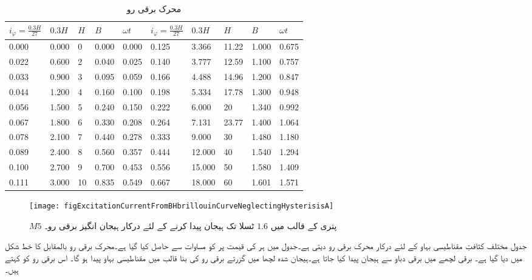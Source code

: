 %
\begin{table}
\begin{otherlanguage}{english}
\begin{tabular}{l l l l l | l l l l l}
$i_{\varphi}=\frac{0.3 H}{27}$&$0.3H$&$H$&$B$&$\omega t$&$i_{\varphi}=\frac{0.3 H}{27}$&$0.3H$&$H$&$B$&$\omega t$\\
\midrule
0.000&0.000&0&0.000&0.000&0.125&3.366&11.22&1.000&0.675\\
0.022&0.600&2&0.040&0.025&0.140&3.777&12.59&1.100&0.757\\
0.033&0.900&3&0.095&0.059&0.166&4.488&14.96&1.200&0.847\\
0.044&1.200&4&0.160&0.100&0.198&5.334&17.78&1.300&0.948\\
0.056&1.500&5&0.240&0.150&0.222&6.000&20&1.340&0.992\\
0.067&1.800&6&0.330&0.208&0.264&7.131&23.77&1.400&1.064\\
0.078&2.100&7&0.440&0.278&0.333&9.000&30&1.480&1.180\\
0.089&2.400&8&0.560&0.357&0.444&12.000&40&1.540&1.294\\
0.100&2.700&9&0.700&0.453&0.556&15.000&50&1.580&1.409\\
0.111&3.000&10&0.835&0.549&0.667&18.000&60&1.601&1.571\\
\bottomrule
\end{tabular}
\caption{محرک برقی رو}
\label{جدول_مقناطیسی_ادوار_محرک_برقی_رو_بالمقابل_کثافت_بہاو}
\end{otherlanguage}
\end{table}
%
\begin{figure}
\centering
\texttt{[image: figExcitationCurrentFromBHbrillouinCurveNeglectingHysterisisA]}
\caption{$M5$ پتری کے قالب میں $1.6$ ٹسلا تک ہیجان پیدا کرنے کے لئے درکار ہیجان انگیز برقی رو۔}
\label{شکل_مقناطیسی_ادوار_ہیجان_رو_چال_نظرانداز}
\end{figure}

جدول   مختلف کثافتِ مقناطیسی بہاو کے لئے درکار محرک برقی رو دیتی ہے۔جدول میں  ہر  کی قیمت پر   کو مساوات    سے حاصل کیا گیا ہے۔محرک برقی رو بالمقابل  کا خط شکل  میں دیا گیا ہے۔
%
برقی لچھے میں برقی دباو سے ہیجان پیدا کیا جاتا ہے۔ہیجان شدہ لچھا میں گزرتے برقی رو  کی بنا  قالب میں مقناطیسی بہاو پیدا ہو گا۔ اس برقی رو  کو   کہتے ہیں۔


